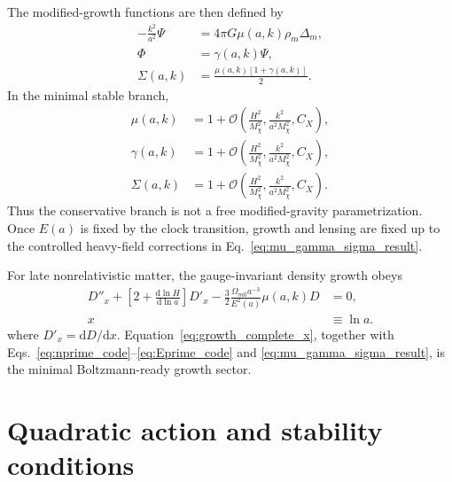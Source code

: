 \documentclass[aps,prd,reprint,nofootinbib,superscriptaddress,longbibliography]{revtex4-2}
\newcommand{\dd}{\mathrm{d}}
\begin{document}
The modified-growth functions are then defined by
\begin{align}
  -\frac{k^2}{a^2}\Psi&=4\pi G\mu(a,k)\rho_m\Delta_m,\label{eq:mu_complete}\\
  \Phi&=\gamma(a,k)\Psi,\label{eq:gamma_complete}\\
  \Sigma(a,k)&=\frac{\mu(a,k)[1+\gamma(a,k)]}{2} .\label{eq:sigma_complete2}
\end{align}
In the minimal stable branch,
\begin{align}
  \mu(a,k)&=1+\mathcal O\left(\frac{H^2}{M_\chi^2},\frac{k^2}{a^2M_\chi^2},C_X\right),\nonumber\\
  \gamma(a,k)&=1+\mathcal O\left(\frac{H^2}{M_\chi^2},\frac{k^2}{a^2M_\chi^2},C_X\right),\label{eq:mu_gamma_sigma_result}\\
  \Sigma(a,k)&=1+\mathcal O\left(\frac{H^2}{M_\chi^2},\frac{k^2}{a^2M_\chi^2},C_X\right).\nonumber
\end{align}
Thus the conservative branch is not a free modified-gravity parametrization.  Once $E(a)$ is fixed by the clock transition, growth and lensing are fixed up to the controlled heavy-field corrections in Eq.~\eqref{eq:mu_gamma_sigma_result}.

For late nonrelativistic matter, the gauge-invariant density growth obeys
\begin{align}
  D''_x+\left[2+\frac{\dd\ln H}{\dd\ln a}\right]D'_x
  -\frac32\frac{\Omega_{m0}a^{-3}}{E^2(a)}\mu(a,k)D&=0,
  \label{eq:growth_complete_x}\\
  x&\equiv\ln a .\nonumber
\end{align}
where $D'_x=\dd D/\dd x$.  Equation~\eqref{eq:growth_complete_x}, together with Eqs.~\eqref{eq:nprime_code}--\eqref{eq:Eprime_code} and \eqref{eq:mu_gamma_sigma_result}, is the minimal Boltzmann-ready growth sector.

\section{Quadratic action and stability conditions}
\label{sec:quadratic_stability_completion}
\end{document}
